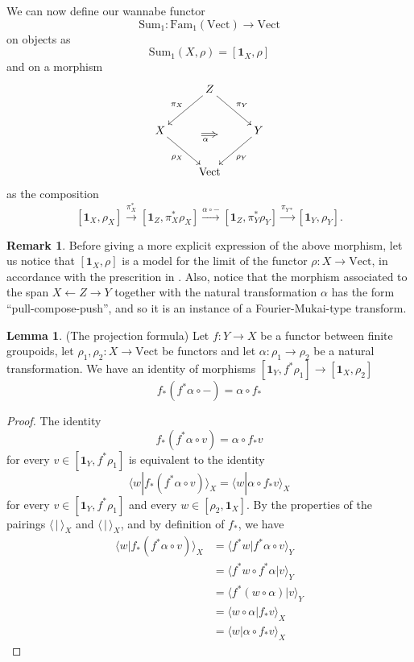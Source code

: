 \documentclass[12pt]{scrartcl}
\theoremstyle{definition}
\newtheorem{lemma}[definition]{Lemma}
\newtheorem{remark}[definition]{Remark}
\numberwithin{equation}{section}
\numberwithin{definition}{section}
\numberwithin{figure}{section}
\begin{document}
We can now define our wannabe functor
\[
\mathrm{Sum}_1\colon \mathrm{Fam}_1(\mathrm{Vect})\to \mathrm{Vect}
\]
on objects as 
\[
\mathrm{Sum}_1(X,\rho)=[\mathbf{1}_X,\rho]
\]
and on a morphism 
\[
\xymatrix{
&Z\ar[dl]_{\pi_X}\ar[dr]^{\pi_Y}&\\
X\ar[dr]_{\rho_X}&&Y\ar[dl]^{\rho_Y}\\
&\mathrm{Vect}
\ar@{=>}_{\alpha\phantom{m}}(13,-14);(18,-14)
}
\]
as the composition
\[
[\mathbf{1}_X,\rho_X]\xrightarrow{\pi_X^*} [\mathbf{1}_Z,\pi_X^*\rho_X]\xrightarrow{\alpha\circ-}  [\mathbf{1}_Z,\pi_Y^*\rho_Y] \xrightarrow{\pi_{Y*}} [\mathbf{1}_Y,\rho_Y].
\]

\begin{remark}
Before giving a more explicit expression of the above morphism, let us notice that $[\mathbf{1}_X,\rho]$ is a model for the limit of the functor $\rho\colon X\to \mathrm{Vect}$, in accordance with the prescrition in \cite{FHLT}. Also, notice that the morphism associated to the span $X\leftarrow Z\to Y$ together with the natural transformation $\alpha$ has the form ``pull-compose-push'', and so it is an instance of a Fourier-Mukai-type transform.
\end{remark}



\begin{lemma} (The projection formula)
\label{lem:projectionformula}
Let $f\colon Y\to X$ be a functor between finite groupoids, let $\rho_1,\rho_2\colon X\to \mathrm{Vect}$ be functors and let $\alpha\colon \rho_1\to\rho_2$ be a natural transformation. We have an identity of morphisms $[\mathbf{1}_Y,f^*\rho_1]\to [\mathbf{1}_X,\rho_2]$
\[
f_*(f^*\alpha\circ -) = \alpha\circ f_*
\] 
\end{lemma}
\begin{proof}
The identity
\[
f_*(f^*\alpha\circ v) = \alpha\circ f_*v
\]
for every $v\in [\mathbf{1}_Y,f^*\rho_1]$ is equivalent to the identity
\[
\langle w| f_*(f^*\alpha\circ v)\rangle_X = \langle w|\alpha\circ f_*v\rangle_X
\]
for every $v\in [\mathbf{1}_Y,f^*\rho_1]$ and every $w\in [\rho_2,\mathbf{1}_X]$. By the properties of the pairings $\langle\,|\,\rangle_X$ and $\langle\,|\,\rangle_X$, and by definition of $f_*$, we have
\begin{align*}
\langle w| f_*(f^*\alpha\circ v)\rangle_X&=\langle f^*w| f^*\alpha\circ v\rangle_Y\\
&=\langle f^*w\circ f^*\alpha| v\rangle_Y\\
&=\langle f^*(w\circ \alpha)| v\rangle_Y\\
&=\langle w\circ \alpha| f_*v\rangle_X\\
&=\langle w| \alpha \circ f_*v\rangle_X
\end{align*}
\end{proof}
\end{document}
